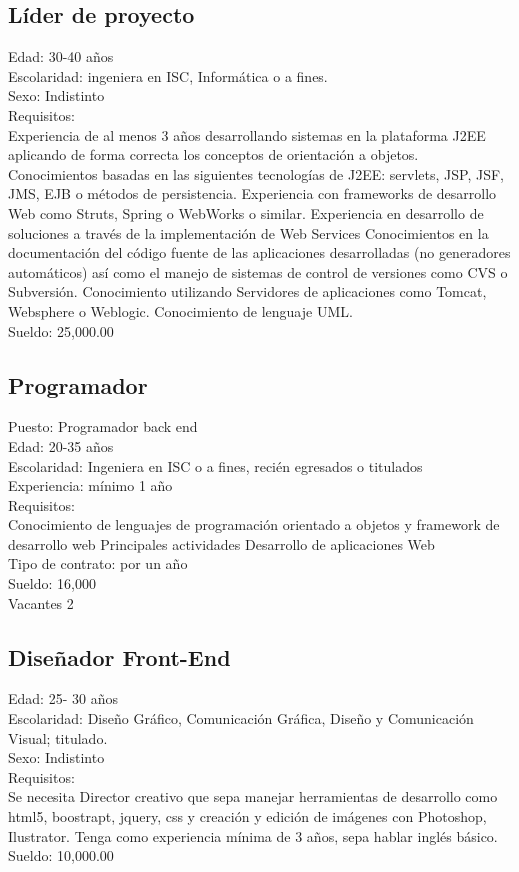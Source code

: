 \documentclass[12pt,letterpaper]{article}
\begin{document}
\subsection*{Líder de proyecto}
Edad: 30-40 años\\
Escolaridad: ingeniera en ISC, Informática o a fines.\\
Sexo: Indistinto\\
Requisitos:\\
Experiencia de al menos 3 años desarrollando sistemas en la plataforma J2EE aplicando de forma correcta los conceptos de orientación a objetos.\\
Conocimientos  basadas en las siguientes tecnologías de J2EE: servlets, JSP, JSF, JMS, EJB o métodos de persistencia.
Experiencia  con frameworks de desarrollo Web como Struts, Spring o WebWorks o similar.
Experiencia en desarrollo de soluciones a través de la implementación de Web Services
Conocimientos en la documentación del código fuente de las aplicaciones desarrolladas (no generadores automáticos) así como el manejo de sistemas de control de versiones como 
CVS o Subversión.
Conocimiento  utilizando Servidores de aplicaciones como Tomcat, Websphere o Weblogic.
Conocimiento de lenguaje UML.\\
Sueldo: 25,000.00\\

\subsection*{Programador}
Puesto: Programador back end\\
Edad: 20-35 años\\
Escolaridad: Ingeniera en ISC o a fines, recién egresados o titulados\\
Experiencia: mínimo 1 año\\
Requisitos:\\
Conocimiento de lenguajes de programación orientado a objetos y framework de desarrollo web 
Principales actividades
Desarrollo de aplicaciones Web\\
Tipo de contrato: por un año\\
Sueldo: 16,000\\
Vacantes 2

\subsection*{Diseñador Front-End}
Edad: 25- 30 años\\
Escolaridad: Diseño Gráfico, Comunicación Gráfica, Diseño y Comunicación Visual; titulado.\\
Sexo: Indistinto\\
Requisitos:\\
Se necesita Director creativo que sepa manejar herramientas de desarrollo como html5, boostrapt, jquery, css y creación y edición de imágenes con Photoshop, Ilustrator. Tenga 
como experiencia mínima de 3 años, sepa hablar inglés básico.\\ 
Sueldo: 10,000.00 
\end{document}
